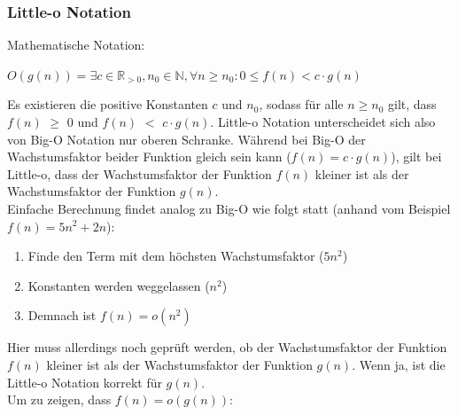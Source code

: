 \documentclass[
../../AuD-Zusammenfassung.tex,
]
{subfiles}
\begin{document}
\subsubsection{Little-o Notation}
Mathematische Notation:
\begin{center}
    $O(g(n)) = \exists c \in \mathbb{R}_{>0}, n_0 \in \mathbb{N}, \forall n \geq n_0:  0 \leq f(n) < c \cdot g(n)$
\end{center}
Es existieren die positive Konstanten $c$ und $n_0$, sodass für alle $n \geq n_0$ gilt, dass  $f(n)$ $\geq$  0 und $f(n)$ $<$ $c \cdot g(n)$. Little-o Notation unterscheidet sich also von Big-O Notation nur oberen Schranke. Während bei Big-O der Wachstumsfaktor beider Funktion gleich sein kann ($f(n) = c \cdot g(n)$), gilt bei Little-o, dass der Wachstumsfaktor der Funktion $f(n)$ kleiner ist als der Wachstumsfaktor der Funktion $g(n)$. \\
Einfache Berechnung findet analog zu Big-O wie folgt statt (anhand vom Beispiel $f(n) = 5n^2 + 2n$):
\begin{enumerate}
    \item Finde den Term mit dem höchsten Wachstumsfaktor ($5n^2$)
    \item Konstanten werden weggelassen ($n^2$)
    \item Demnach ist $f(n) = o(n^2)$
\end{enumerate}
Hier muss allerdings noch geprüft werden, ob der Wachstumsfaktor der Funktion $f(n)$ kleiner ist als der Wachstumsfaktor der Funktion $g(n)$. Wenn ja, ist die Little-o Notation korrekt für $g(n)$. \\
Um zu zeigen, dass $f(n) = o(g(n))$:
\end{document}
